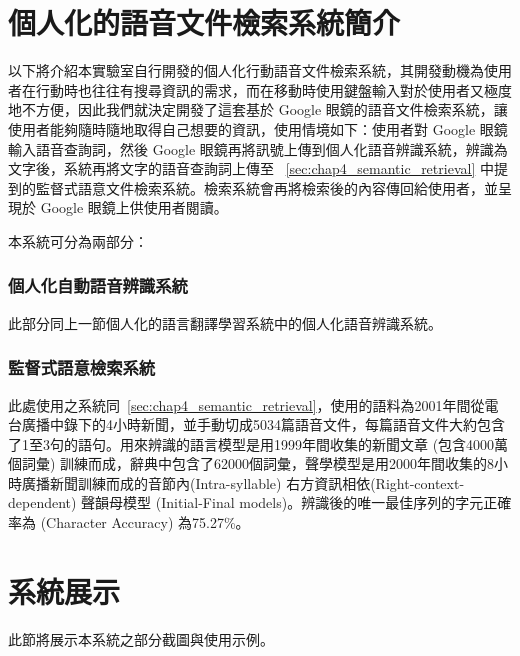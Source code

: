 \section{個人化的語音文件檢索系統簡介}
以下將介紹本實驗室自行開發的個人化行動語音文件檢索系統，其開發動機為使用者在行動時也往往有搜尋資訊的需求，而在移動時使用鍵盤輸入對於使用者又極度地不方便，因此我們就決定開發了這套基於 Google 眼鏡的語音文件檢索系統，讓使用者能夠隨時隨地取得自己想要的資訊，使用情境如下：使用者對 Google 眼鏡輸入語音查詢詞，然後 Google 眼鏡再將訊號上傳到個人化語音辨識系統，辨識為文字後，系統再將文字的語音查詢詞上傳至
~\ref{sec:chap4_semantic_retrieval} 中提到的監督式語意文件檢索系統。檢索系統會再將檢索後的內容傳回給使用者，並呈現於 Google 眼鏡上供使用者閱讀。

本系統可分為兩部分：

\subsubsection{個人化自動語音辨識系統}

此部分同上一節個人化的語言翻譯學習系統中的個人化語音辨識系統。

\subsubsection{監督式語意檢索系統}

此處使用之系統同~\ref{sec:chap4_semantic_retrieval}，使用的語料為2001年間從電台廣播中錄下的4小時新聞，並手動切成5034篇語音文件，每篇語音文件大約包含了1至3句的語句。用來辨識的語言模型是用1999年間收集的新聞文章 (包含4000萬個詞彙) 訓練而成，辭典中包含了62000個詞彙，聲學模型是用2000年間收集的8小時廣播新聞訓練而成的音節內(Intra-syllable)
右方資訊相依(Right-context-dependent) 聲韻母模型 (Initial-Final models)。辨識後的唯一最佳序列的字元正確率為 (Character Accuracy) 為75.27\%。
\section{系統展示}
此節將展示本系統之部分截圖與使用示例。


